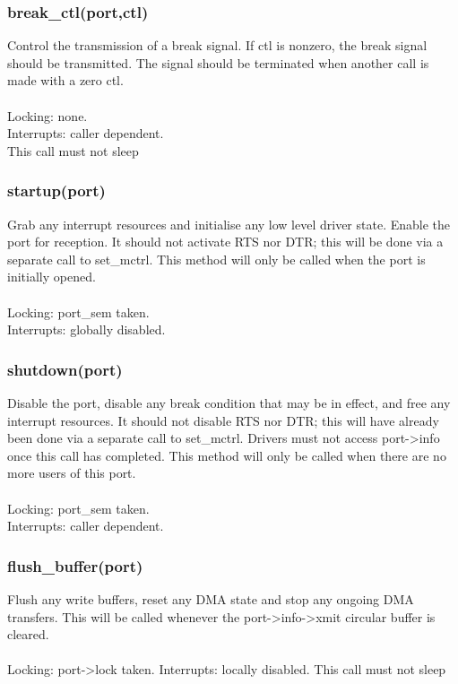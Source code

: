 \documentclass[12pt,a4paper]{article}
\begin{document}
\subsubsection{break\_ctl(port,ctl)}
	Control the transmission of a break signal.  If ctl is
	nonzero, the break signal should be transmitted.  The signal
	should be terminated when another call is made with a zero
	ctl.\\ \\
	Locking: none.\\
	Interrupts: caller dependent.\\
	This call must not sleep\\

\subsubsection{startup(port)}
	Grab any interrupt resources and initialise any low level driver
	state.  Enable the port for reception.  It should not activate
	RTS nor DTR; this will be done via a separate call to set\_mctrl.
	This method will only be called when the port is initially opened.\\ \\
	Locking: port\_sem taken.\\
	Interrupts: globally disabled.\\

\subsubsection{shutdown(port)}
	Disable the port, disable any break condition that may be in
	effect, and free any interrupt resources.  It should not disable
	RTS nor DTR; this will have already been done via a separate
	call to set\_mctrl.
Drivers must not access port-\textgreater info once this call has completed.
	This method will only be called when there are no more users of
	this port.\\ \\
	Locking: port\_sem taken.\\
	Interrupts: caller dependent.\\

\subsubsection{flush\_buffer(port)}
	Flush any write buffers, reset any DMA state and stop any
	ongoing DMA transfers.
	This will be called whenever the port-\textgreater info-\textgreater  xmit circular buffer is cleared. \\ \\
	Locking: port-\textgreater lock taken.
	Interrupts: locally disabled.
	This call must not sleep
\end{document}
